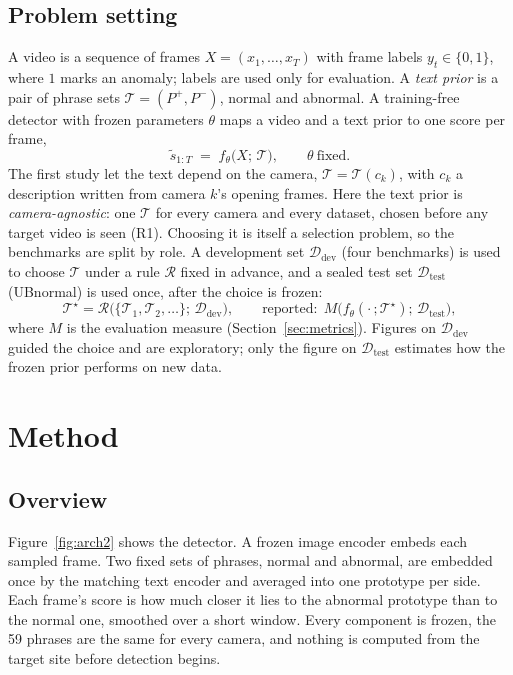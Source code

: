 \documentclass[a4paper,fleqn]{cas-sc}
\begin{document}
\subsection{Problem setting}
\label{sec:setting}
A video is a sequence of frames $X=(x_1,\dots,x_T)$ with frame labels
$y_t\in\{0,1\}$, where $1$ marks an anomaly; labels are used only for evaluation. A
\emph{text prior} is a pair of phrase sets $\mathcal{T}=(P^{+},P^{-})$, normal and
abnormal. A training-free detector with frozen parameters $\theta$ maps a video and a
text prior to one score per frame,
\begin{equation}
\tilde{s}_{1:T} \;=\; f_\theta\big(X;\,\mathcal{T}\big), \qquad \theta\ \text{fixed}.
\label{eq:detector}
\end{equation}
The first study let the text depend on the camera, $\mathcal{T}=\mathcal{T}(c_k)$,
with $c_k$ a description written from camera $k$'s opening frames. Here the text prior is
\emph{camera-agnostic}: one $\mathcal{T}$ for every camera and every dataset, chosen
before any target video is seen (R1). Choosing it is itself a selection problem, so the
benchmarks are split by role. A development set $\mathcal{D}_{\mathrm{dev}}$ (four
benchmarks) is used to choose $\mathcal{T}$ under a rule $\mathcal{R}$ fixed in advance,
and a sealed test set $\mathcal{D}_{\mathrm{test}}$ (UBnormal) is used once, after the
choice is frozen:
\begin{equation}
\mathcal{T}^{\star} = \mathcal{R}\big(\{\mathcal{T}_1,\mathcal{T}_2,\dots\};\,
\mathcal{D}_{\mathrm{dev}}\big), \qquad
\text{reported:}\ \ M\big(f_\theta(\cdot\,;\mathcal{T}^{\star});\,\mathcal{D}_{\mathrm{test}}\big),
\label{eq:selection}
\end{equation}
where $M$ is the evaluation measure (Section~\ref{sec:metrics}). Figures on
$\mathcal{D}_{\mathrm{dev}}$ guided the choice and are exploratory; only the figure on
$\mathcal{D}_{\mathrm{test}}$ estimates how the frozen prior performs on new data.

\section{Method}
\label{sec:method}

\subsection{Overview}
Figure~\ref{fig:arch2} shows the detector. A frozen image encoder embeds each sampled
frame. Two fixed sets of phrases, normal and abnormal, are embedded once by the
matching text encoder and averaged into one prototype per side. Each frame's score is
how much closer it lies to the abnormal prototype than to the normal one, smoothed
over a short window. Every component is frozen, the 59 phrases are the same for every
camera, and nothing is computed from the target site before detection begins.
\end{document}
